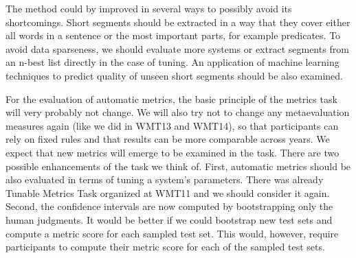 The  method could by improved in several ways to possibly
avoid its shortcomings. Short segments should be extracted in a way that they
cover either all words in a sentence or the most important parts, for example
predicates. To avoid data sparseness, we should evaluate more systems or
extract segments from an n-best list directly in the case of tuning. An
application of machine learning techniques to predict quality of unseen short
segments should be also examined.

For the evaluation of automatic metrics, the basic principle of the metrics
task will very probably not change. We will also try not to change any
metaevaluation measures again (like we did in WMT13 and WMT14), so that
participants can rely on fixed rules and that results can be more comparable
across years. We expect that new metrics will emerge to be examined in the
task. There are two possible enhancements of the task we think of. First,
automatic metrics should be also evaluated in terms of tuning a system's
parameters.  There was already Tunable Metrics Task organized at WMT11 and we
should consider it again.  Second, the confidence intervals are now computed by
bootstrapping only the human judgments. It would be better if we could
bootstrap new test sets and compute a metric score for each sampled test set.
This would, however, require participants to compute their metric score for
each of the sampled test sets.


